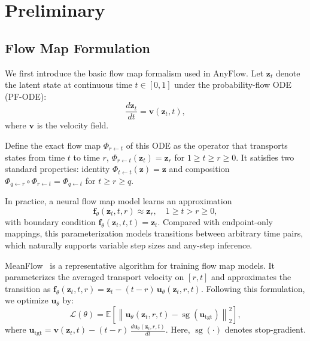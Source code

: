 
\section{Preliminary}
\label{sec:preliminary}

\subsection{Flow Map Formulation}

We first introduce the basic flow map formalism used in AnyFlow.
Let $\mathbf{z}_t$ denote the latent state at continuous time $t\in[0,1]$ under the probability-flow ODE (PF-ODE):
\begin{equation}
  \frac{d\mathbf{z}_t}{dt} = \mathbf{v}(\mathbf{z}_t, t),
\end{equation}
where $\mathbf{v}$ is the velocity field.

Define the exact flow map $\Phi_{r\leftarrow t}$ of this ODE as the operator that transports states from time $t$ to time $r$, \ie $\Phi_{r\leftarrow t}(\mathbf{z}_t)=\mathbf{z}_r$ for $1\ge t\ge r\ge 0$.
It satisfies two standard properties: identity $\Phi_{t\leftarrow t}(\mathbf{z})=\mathbf{z}$ and composition $\Phi_{q\leftarrow r}\circ\Phi_{r\leftarrow t}=\Phi_{q\leftarrow t}$ for $t\ge r\ge q$.

In practice, a neural flow map model learns an approximation
\begin{equation}
  \mathbf{f}_\theta(\mathbf{z}_t, t, r) \approx \mathbf{z}_r, \quad 1 \ge t > r \ge 0,
\end{equation}
with boundary condition $\mathbf{f}_\theta(\mathbf{z}_t,t,t)=\mathbf{z}_t$.
Compared with endpoint-only mappings, this parameterization models transitions between arbitrary time pairs, which naturally supports variable step sizes and any-step inference.





MeanFlow~\cite{geng2025mean} is a representative algorithm for training flow map models. It parameterizes the averaged transport velocity on $[r,t]$ and approximates the transition as $\mathbf{f}_\theta(\mathbf{z}_t,t,r)=\mathbf{z}_t-(t-r)\,\mathbf{u}_\theta(\mathbf{z}_t,r,t)$. Following this formulation, we optimize $\mathbf{u}_\theta$ by:
\begin{equation}
  \label{eq:meanflow}
  \mathcal{L}(\theta)
  = \mathbb{E}\left[\left\|\mathbf{u}_\theta(\mathbf{z}_t, r, t)-\operatorname{sg}\!\left(\mathbf{u}_{\text{tgt}}\right)\right\|_2^2\right],
\end{equation}
where $\mathbf{u}_{\text{tgt}}=\mathbf{v}(\mathbf{z}_t,t) - (t-r)\,\frac{d\mathbf{u}_\theta(\mathbf{z}_t,r,t)}{dt}$.
Here, $\operatorname{sg}(\cdot)$ denotes stop-gradient.

